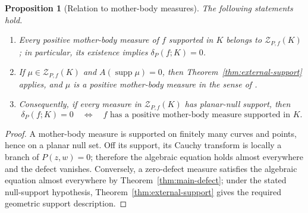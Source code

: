 \documentclass[10pt,a4paper]{amsart}
\newtheorem{proposition}[theorem]{Proposition}
\newcommand{\supp}{\operatorname{supp}}
\begin{document}
\begin{proposition}[Relation to mother-body measures]
\label{prop:motherbody-relation}
The following statements hold.
\begin{enumerate}[label=\textup{(\roman*)}]
\item Every positive mother-body measure of $f$ supported in $K$ belongs to
$\mathcal Z_{P,f}(K)$; in particular, its existence implies
$\delta_P(f;K)=0$.
\item If $\mu\in\mathcal Z_{P,f}(K)$ and $A(\supp\mu)=0$, then
Theorem~\ref{thm:external-support} applies, and $\mu$ is a positive mother-body
measure in the sense of \cite{BoSh}.
\item Consequently, if every measure in $\mathcal Z_{P,f}(K)$ has planar-null
support, then
\begin{equation}\label{eq:conditional-equivalence}
 \delta_P(f;K)=0
 \quad\Longleftrightarrow\quad
 f\text{ has a positive mother-body measure supported in }K.
\end{equation}
\end{enumerate}
\end{proposition}

\begin{proof}
A mother-body measure is supported on finitely many curves and points, hence on
a planar null set.  Off its support, its Cauchy transform is locally a branch
of $P(z,w)=0$; therefore the algebraic equation holds almost everywhere and the
defect vanishes.  Conversely, a zero-defect measure satisfies the algebraic
equation almost everywhere by Theorem~\ref{thm:main-defect}; under the stated
null-support hypothesis, Theorem~\ref{thm:external-support} gives the required
geometric support description.
\end{proof}
\end{document}
